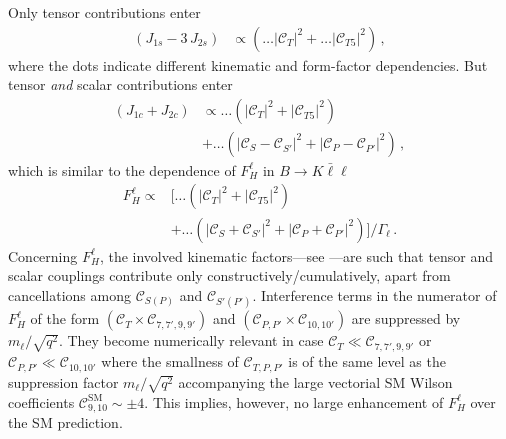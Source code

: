 \documentclass[twocolumn,epjc3]{svjour3}
\numberwithin{equation}{section}
\newcommand{\wilson}[2][{}]{\mathcal{C}_{#2}^{\mathrm{#1}}}
\renewcommand{\[}{\big[}
\renewcommand{\]}{\big]}
\renewcommand{\(}{\big(}
\renewcommand{\)}{\big)}
\begin{document}
Only tensor contributions enter
\begin{align}
  (J_{1s} - 3\, J_{2s}) & \propto
  \left(\ldots |\wilson{T}|^2 + \ldots |\wilson{T5}|^2 \right) \,,
\end{align}
where the dots indicate different kinematic and form-factor dependencies.  But
tensor \emph{and} scalar contributions enter
\begin{equation}
\begin{aligned}
  (J_{1c} + J_{2c}) & \propto
      \ldots \left(|\wilson{T}|^2 + |\wilson{T5}|^2 \right)
\\
  & + \ldots \left(|\wilson{S} - \wilson{S'}|^2 + |\wilson{P} - \wilson{P'}|^2 \right) \,,
\end{aligned}
\end{equation}
which is similar to the dependence of $F_H^\ell$ in $B\to K
\bar\ell\ell$
\begin{equation}
  \label{eq:FH-dependence}
\begin{aligned}
  F_H^\ell  \propto & \Big[
      \ldots \left(|\wilson{T}|^2 + |\wilson{T5}|^2\right)
\\
  & + \ldots \left(|\wilson{S} + \wilson{S'}|^2 + |\wilson{P} + \wilson{P'}|^2 \right)
  \Big]
  \Big/ \Gamma_\ell \,.
\end{aligned}
\end{equation}
Concerning $F_H^\ell$, the involved kinematic factors---see
\cite{Bobeth:2007dw, Bobeth:2012vn}---are such that tensor and scalar
couplings contribute only constructively/cumulatively, apart from
cancellations among $\wilson{S(P)}$ and $\wilson{S'(P')}$.
Interference terms in the numerator of $F_H^\ell$ of the form
$(\wilson{T} \times \wilson{7,7',9,9'})$ and $(\wilson{P,P'} \times
\wilson{10,10'})$ are suppressed by $m_\ell/\sqrt{q^2}$. They become
numerically relevant in case $\wilson{T} \ll \wilson{7,7',9,9'}$ or
$\wilson{P,P'} \ll\wilson{10,10'}$ where the smallness of
$\wilson{T,P,P'}$ is of the same level as the suppression factor
$m_\ell/\sqrt{q^2}$ accompanying the large vectorial SM Wilson
coefficients $\wilson[SM]{9,10} \sim \pm 4$. This implies, however, no
large enhancement of $F_H^\ell$ over the SM prediction.
\end{document}
